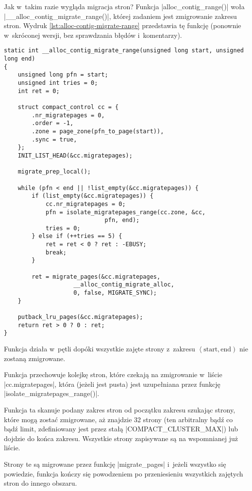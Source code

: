 Jak w~takim razie wygląda migracja stron?  Funkcja
\code|alloc_contig_range()| woła
\code|__alloc_contig_migrate_range()|, której zadaniem jest
zmigrowanie zakresu stron.  Wydruk
\ref{lst:alloc-contig-migrate-range} przedstawia tę funkcję (ponownie
w~skróconej wersji, bez sprawdzania błędów i~komentarzy).

\begin{lstlisting}[float=tbhp,caption={Skrócony wydruk funkcji
    \code|__alloc_conting_migrate_range()| z Linuksa 3.5.},label=lst:alloc-contig-migrate-range]
static int __alloc_contig_migrate_range(unsigned long start, unsigned long end)
{
	unsigned long pfn = start;
	unsigned int tries = 0;
	int ret = 0;

	struct compact_control cc = {
		.nr_migratepages = 0,
		.order = -1,
		.zone = page_zone(pfn_to_page(start)),
		.sync = true,
	};
	INIT_LIST_HEAD(&cc.migratepages);

	migrate_prep_local();

	while (pfn < end || !list_empty(&cc.migratepages)) {
		if (list_empty(&cc.migratepages)) {
			cc.nr_migratepages = 0;
			pfn = isolate_migratepages_range(cc.zone, &cc,
							 pfn, end);
			tries = 0;
		} else if (++tries == 5) {
			ret = ret < 0 ? ret : -EBUSY;
			break;
		}

		ret = migrate_pages(&cc.migratepages,
				    __alloc_contig_migrate_alloc,
				    0, false, MIGRATE_SYNC);
	}

	putback_lru_pages(&cc.migratepages);
	return ret > 0 ? 0 : ret;
}
\end{lstlisting}

Funkcja działa w~pętli dopóki wszystkie zajęte strony z~zakresu
$\left<\mathrm{start}, \mathrm{end}\right)$ nie zostaną zmigrowane.

Funkcja przechowuje kolejkę stron, które czekają na zmigrowanie
w~liście \code|cc.migratepages|, która (jeżeli jest pusta) jest
uzupełniana przez funkcję \code|isolate_migratepages_range()|.

Funkcja ta skanuje podany zakres stron od początku zakresu szukając
strony, które mogą zostać zmigrowane, aż znajdzie 32 strony (ten
arbitralny bądź co bądź limit, zdefiniowany jest przez stałą
\code|COMPACT_CLUSTER_MAX|) lub dojdzie do końca zakresu.
Wszystkie strony zapisywane są na wspomnianej już liście.

Strony te są migrowane przez funkcję \code|migrate_pages|
i~jeżeli wszystko się powiedzie, funkcja kończy się powodzeniem po
przeniesieniu wszystkich zajętych stron do innego obszaru.


